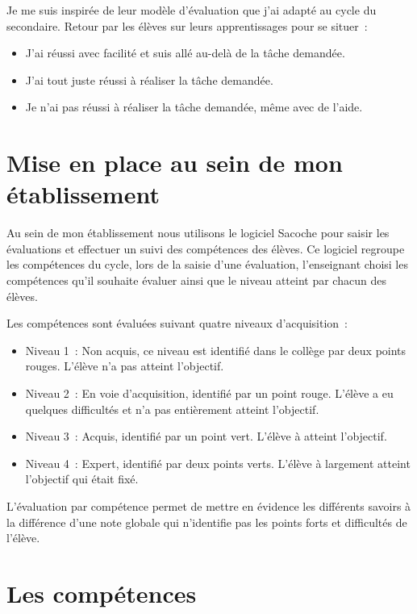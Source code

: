 Je me suis inspirée de leur modèle d'évaluation que j'ai adapté au cycle du secondaire.
Retour par les élèves sur leurs apprentissages pour se situer~:
\begin{itemize}
\item J'ai réussi avec facilité et suis allé au-delà de la tâche demandée. 
\item J'ai tout juste réussi à réaliser la tâche demandée.
\item Je n'ai pas réussi à réaliser la tâche demandée, même avec de l'aide.
\end{itemize} 


\newpage
\section{Mise en place au sein de mon établissement}

Au sein de mon établissement nous utilisons le logiciel Sacoche pour saisir les évaluations et effectuer un suivi des compétences des élèves.
Ce logiciel regroupe les compétences du cycle, lors de la saisie d'une évaluation, l'enseignant choisi les compétences qu'il souhaite évaluer ainsi que le niveau atteint par chacun des élèves.

Les compétences sont évaluées suivant quatre niveaux d'acquisition~:
\begin{itemize}
\item Niveau 1~: Non acquis, ce niveau est identifié dans le collège par deux points rouges. L'élève n'a pas atteint l'objectif.
\item Niveau 2~: En voie d'acquisition, identifié par un point rouge. L'élève a eu quelques difficultés et n'a pas entièrement atteint l'objectif.
\item Niveau 3~: Acquis, identifié par un point vert. L'élève à atteint l'objectif.
\item Niveau 4~: Expert, identifié par deux points verts. L'élève à largement atteint l'objectif qui était fixé.
\end{itemize}

L'évaluation par compétence permet de mettre en évidence les différents savoirs à la différence d'une note globale qui n'identifie pas les points forts et difficultés de l'élève.

\newpage
\section{Les compétences}

